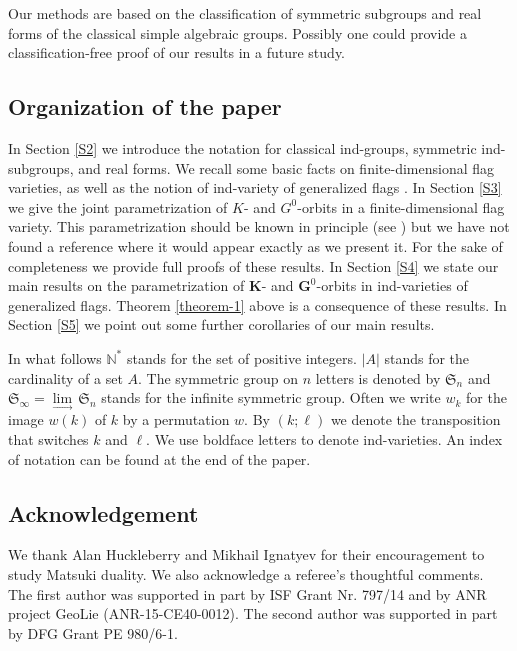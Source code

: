 \documentclass{amsart}
\theoremstyle{definition}
\newcommand{\NN}{\mathbb{N}^*}
\begin{document}
Our methods are based on the classification of symmetric subgroups and real forms of the classical simple algebraic groups.  Possibly one could provide a classification-free proof of our results in a future study.

\subsection*{Organization of the paper}

In Section \ref{S2} we introduce the notation for classical ind-groups, symmetric ind-subgroups, and real forms.
We recall some basic facts on finite-dimensional flag varieties, as well as the notion of ind-variety of generalized flags \cite{Dimitrov-Penkov,Ignatyev-Penkov}.
In Section \ref{S3} we give 
the joint parametrization of $K$- and $G^0$-orbits in a finite-dimensional flag variety.
This parametrization should be known in principle (see \cite{MO,Y})
but we have not found a reference where it would appear exactly as we present it. For the sake of completeness we provide full proofs of these results.
In
Section \ref{S4} we state our main results on the parametrization of $\mathbf{K}$- and $\mathbf{G}^0$-orbits in ind-varieties of generalized flags. Theorem \ref{theorem-1} above is a consequence of these results.
In Section \ref{S5} we point out some further corollaries of our main results.

In what follows $\NN$ stands for the set of positive integers.
$|A|$ stands for the cardinality of a set $A$.  The symmetric group on $n$ letters is denoted by $\mathfrak{S}_n$ and $\mathfrak{S}_\infty=\lim\limits_{\longrightarrow}\,\mathfrak{S}_n$ stands for the infinite symmetric group. 
Often we write $w_k$ for the image $w(k)$ of $k$ by a permutation $w$.
By $(k;\ell)$ we denote the transposition that switches $k$ and $\ell$.
We use boldface letters to denote ind-varieties.  
An index of notation can be found at the end of the paper.

\subsection*{Acknowledgement}


We thank Alan Huckleberry and Mikhail Ignatyev for their encouragement to study Matsuki duality.  We also acknowledge a referee's thoughtful comments.  The first author was supported in part by ISF Grant Nr. 797/14 and by ANR project GeoLie (ANR-15-CE40-0012).  The second author was supported in part by DFG Grant PE 980/6-1.
\end{document}
